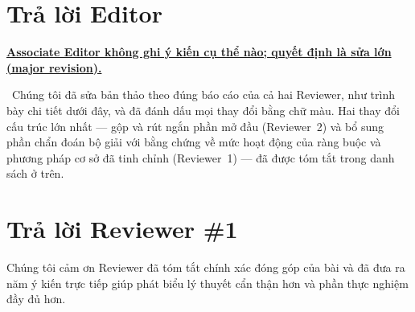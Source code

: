 \documentclass[11pt]{article}
\newcommand{\response}[1]{\smallskip\noindent{\color{blue!60!black}\textbf{Trả lời.}}\ #1\par\medskip}
\newenvironment{point}[1]{\medskip\noindent\textbf{\uline{#1}}\par}{\par}
\begin{document}
\section*{Trả lời Editor}

\begin{point}{Associate Editor không ghi ý kiến cụ thể nào; quyết định là sửa lớn (major
revision).}
\response{Chúng tôi đã sửa bản thảo theo đúng báo cáo của cả hai Reviewer,
như trình bày chi tiết dưới đây, và đã đánh dấu mọi thay đổi bằng chữ màu. Hai thay đổi
cấu trúc lớn nhất --- gộp và rút ngắn phần mở đầu (Reviewer~2)
và bổ sung phần chẩn đoán bộ giải với bằng chứng về mức hoạt động của ràng buộc và phương pháp cơ sở đã tinh chỉnh
(Reviewer~1) --- đã được tóm tắt trong danh sách ở trên.}
\end{point}

\section*{Trả lời Reviewer \#1}

\noindent Chúng tôi cảm ơn Reviewer đã tóm tắt chính xác đóng góp của bài và đã đưa ra năm
ý kiến trực tiếp giúp phát biểu lý thuyết cẩn thận hơn và phần thực nghiệm
đầy đủ hơn.
\end{document}
